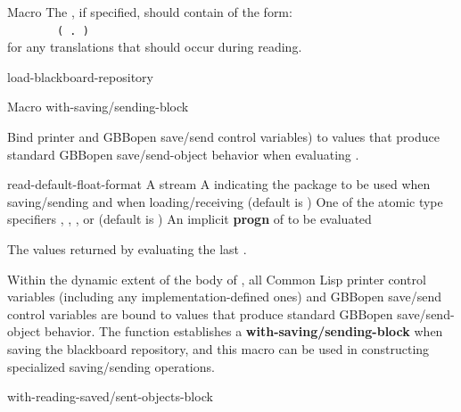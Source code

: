 \documentclass[10pt,twoside,english,pdftex]{article}
\begin{document}
\begin{functiondoc}{Macro}
The  , if specified,
should contain  of the form:\\
%
~~~~~~~~\texttt{( . )}\\
%
for any  translations that should occur during reading.

\begin{alsos}{load-blackboard-repository}
\end{alsos}

\end{functiondoc}


\begin{functiondoc}{Macro}%
  {with-saving/sending-block}%
  {\code{(} 
     \code{)}
    \superstar
    \returns{} \superstar}
  
\fnsyntax

\fnpurpose Bind printer and GBBopen save/send control variables) to
values that produce standard GBBopen save/send-object behavior when
evaluating .

\fnpackage {}

\fnmodule {}

\fnargs
\begin{args}{read-default-float-format}
\arg[stream] A stream
\arg[package] A  indicating the package to
be used when saving/sending and when loading/receiving (default is
)
 One of the atomic type specifiers
, , , or
 (default is )
\arg[forms] An implicit \textbf{progn} of  to be evaluated
\end{args}

\fnreturns The values returned by evaluating the last .

\fndescription 
Within the dynamic extent of the body of , all Common Lisp
printer control variables (including any implementation-defined ones)
and GBBopen save/send control variables are bound to values that
produce standard GBBopen save/send-object behavior.  The function
\textbf{} establishes a
\textbf{with-saving/sending-block} when saving the blackboard
repository, and this macro can be used in constructing specialized
saving/sending operations.

\begin{alsos}{with-reading-saved/sent-objects-block}
\end{alsos}

\end{functiondoc}
\end{document}
